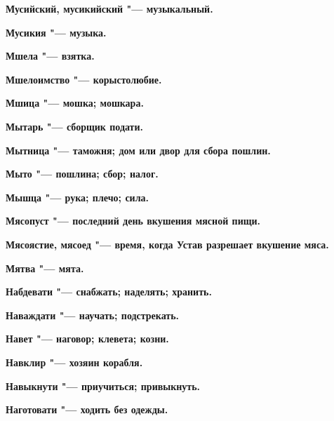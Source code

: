 \bfseries Мусийский, мусикийский \normalfont{} "--- музыкальный. 




\bfseries Мусикия \normalfont{} "--- музыка. 




\bfseries Мшела \normalfont{} "--- взятка. 




\bfseries Мшелоимство \normalfont{} "--- корыстолюбие. 




\bfseries Мшица \normalfont{} "--- мошка; мошкара. 




\bfseries Мытарь \normalfont{} "--- сборщик подати. 




\bfseries Мытница \normalfont{} "--- таможня; дом или двор для сбора пошлин. 




\bfseries Мыто \normalfont{} "--- пошлина; сбор; налог. 




\bfseries Мышца \normalfont{} "--- рука; плечо; сила. 




\bfseries Мясопуст \normalfont{} "--- последний день вкушения мясной пищи. 




\bfseries Мясоястие, мясоед \normalfont{} "--- время, когда Устав разрешает вкушение мяса. 




\bfseries Мятва \normalfont{} "--- мята. 




 





\bfseries Набдевати \normalfont{} "--- снабжать; наделять; хранить. 




\bfseries Наваждати \normalfont{} "--- научать; подстрекать. 




\bfseries Навет \normalfont{} "--- наговор; клевета; козни. 




\bfseries Навклир \normalfont{} "--- хозяин корабля. 




\bfseries Навыкнути \normalfont{} "--- приучиться; привыкнуть. 




\bfseries Наготовати \normalfont{} "--- ходить без одежды. 




